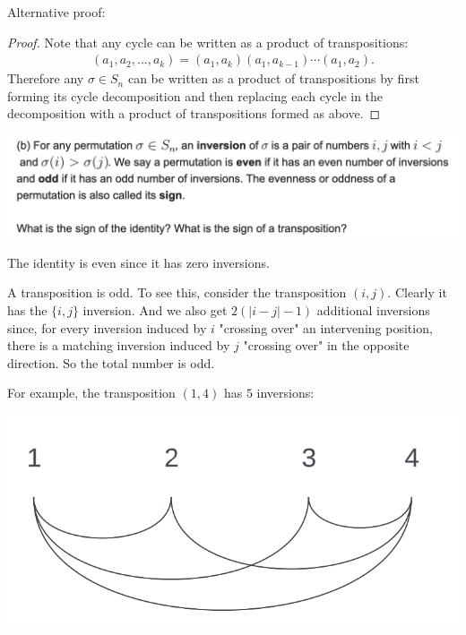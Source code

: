 Alternative proof:

\begin{proof}
  Note that any cycle can be written as a product of transpositions:
  \begin{align*}
     (a_1, a_2, \ldots, a_k) = (a_1, a_k)(a_1, a_{k-1}) \cdots (a_1, a_2).
  \end{align*}
  Therefore any $\sigma \in S_n$ can be written as a product of transpositions by first forming its cycle
  decomposition and then replacing each cycle in the decomposition with a product of transpositions
  formed as above.
\end{proof}


\begin{mdframed}
\includegraphics[width=400pt]{img/algebra--nf--2-d8ce.png}
\end{mdframed}


The identity is even since it has zero inversions.

A transposition is odd. To see this, consider the transposition $(i, j)$. Clearly it has
the $\{i, j\}$ inversion. And we also get $2(|i - j| - 1)$ additional inversions since, for every
inversion induced by $i$ "crossing over" an intervening position, there is a matching inversion
induced by $j$ "crossing over" in the opposite direction. So the total number is odd.

For example, the transposition $(1, 4)$ has $5$ inversions:
\begin{mdframed}
\includegraphics[width=400pt]{img/abstract-algebra--nf--2-e92f.png}
\end{mdframed}





